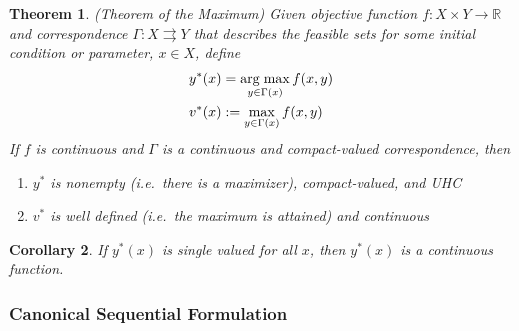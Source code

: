 \documentclass[12pt]{article}
\numberwithin{equation}{section} %
\theoremstyle{plain}
\newtheorem{thm}{Theorem}[section]
\newtheorem{cor}[thm]{Corollary}
\theoremstyle{definition}
\theoremstyle{remark}
\newcommand{\R}{\mathbb{R}}
\DeclareMathOperator*{\argmax}{arg\;max}
\begin{document}
\begin{thm}{\emph{(Theorem of the Maximum)}}
Given objective function $f:X\times Y\rightarrow\R$ and correspondence
$\Gamma:X\rightrightarrows Y$ that describes the feasible sets for some
initial condition or parameter, $x\in X$, define
\begin{align}
  y^*(x) &= \argmax_{y\in \Gamma(x)} f(x,y) \notag\\
  v^*(x) &:= \max_{y\in \Gamma(x)} f(x,y)
  \label{prob:thm-max}
\end{align}
If $f$ is continuous and $\Gamma$ is a continuous and compact-valued
correspondence, then
\begin{enumerate}
  \item $y^*$ is nonempty (i.e.\ there is a maximizer), compact-valued,
    and UHC
  \item $v^*$ is well defined (i.e.\ the maximum is attained) and
    continuous
\end{enumerate}
\end{thm}

\begin{cor}
If $y^*(x)$ is single valued for all $x$, then $y^*(x)$ is a continuous
function.
\end{cor}


\clearpage
\subsubsection{Canonical Sequential Formulation}
\end{document}
